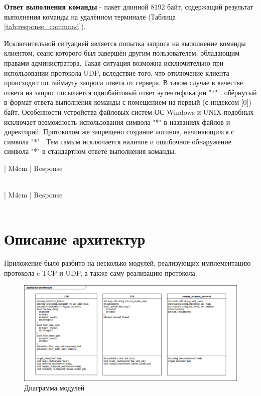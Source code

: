 \textbf{Ответ выполнения команды} - пакет длинной 8192 байт, содержащий результат выполнения команды на удалённом терминале (Таблица \ref{tab:response_command}).

Исключительной ситуацией является попытка запроса на выполнение команды клиентом, сеанс которого был завершён другим пользователем, обладающим правами администратора. Такая ситуация возможна исключительно при использовании протокола UDP, вследствие того, что отключение клиента происходит по таймауту запроса ответа от сервера. В таком случае в качестве ответа на запрос посылается однобайтовый ответ аутентификации "*"  , обёрнутый в формат ответа выполнения команды с помещением на первый (с индексом [0]) байт. Особенности устройства файловых систем ОС Windows и UNIX-подобных исключает возможность использования символа "*" в названиях файлов и директорий. Протоколом же запрещено создание логинов, начинающихся с символа "*" . Тем самым исключается наличие и ошибочное обнаружение символа "*" в стандартном ответе выполнения команды.

\begin{table}[h]
	\centering
	\begin{tabular}[center]{| M{4cm} |}
	\hline
	Response \\ \hline
	[ 0 - 1 ]\\
	\hline
	\end{tabular}
	\caption{Формат ответа аутентификации}
	\label{tab:response_login}
\end{table}

\begin{table}[h]
	\centering
	\begin{tabular}[center]{| M{4cm} |}
	\hline
	Response \\ \hline
	[ 0 - 8191 ]\\
	\hline
	\end{tabular}
	\caption{Формат ответа выполнения команды}
	\label{tab:response_command}
\end{table}

\section{Описание архитектур}

Приложение было разбито на несколько модулей, реализующих имплементацию протокола c TCP и UDP, а также саму реализацию протокола. 

\begin{figure}[H]
\centering
\includegraphics[width=1\textwidth]{pics/arch.png}
\caption{Диаграмма модулей}
\label{diag_mod}
\end{figure}

